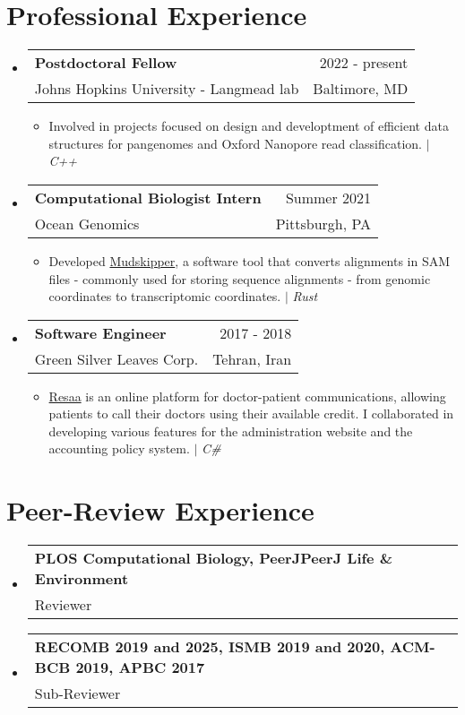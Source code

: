 \documentclass[A4,11pt]{article}
\makeatletter
\newcommand{\CVItem}[1]{
  \item\small{
    {#1 \vspace{-2pt}}
  }
}
\newcommand{\CVSubheading}[4]{
  \vspace{-2pt}\item
    \begin{tabular*}{0.97\textwidth}[t]{l@{\extracolsep{\fill}}r}
      \textbf{#1} & #2 \\
      \small#3 & \small #4 \\
    \end{tabular*}\vspace{-7pt}
}
\newcommand{\CVSubHeadingListStart}{\begin{itemize}[leftmargin=0.5cm, label={}]}
\newcommand{\CVSubHeadingListEnd}{\end{itemize}}
\newcommand{\CVItemListStart}{\begin{itemize}}
\newcommand{\CVItemListEnd}{\end{itemize}\vspace{-5pt}}
\makeatother
\begin{document}
\section{Professional Experience}
  \CVSubHeadingListStart
    \CVSubheading{Postdoctoral Fellow}{2022 - present}
      {Johns Hopkins University - Langmead lab}{Baltimore, MD}
      \CVItemListStart
        \CVItem{Involved in projects focused on design and developtment of efficient data structures for pangenomes and Oxford Nanopore read classification. $|$ \emph{\small{C++}}}
      \CVItemListEnd
    \CVSubheading
      {Computational Biologist Intern}{Summer 2021} %
      {Ocean Genomics}{Pittsburgh, PA}
      \CVItemListStart
        \CVItem{Developed \href{https://github.com/OceanGenomics/mudskipper}{Mudskipper}, a software tool that converts alignments in SAM files - commonly used for storing
sequence alignments - from genomic coordinates to transcriptomic coordinates. $|$ \emph{\small{Rust}}}
      \CVItemListEnd
    \CVSubheading
      {Software Engineer}{2017 - 2018} %
      {Green Silver Leaves Corp.}{Tehran, Iran}
      \CVItemListStart
        \CVItem{\href{https://resaa.net/}{Resaa} is an online platform for doctor-patient communications, allowing patients to call
        their doctors using their available credit. I collaborated in developing various features for the administration website and the accounting
        policy system. $|$ \emph{\small{C\#}}}
      \CVItemListEnd
  \CVSubHeadingListEnd
  
\section{Peer-Review Experience}
\CVSubHeadingListStart
\CVSubheading {PLOS Computational Biology, PeerJPeerJ Life \& Environment}{}{Reviewer}{}
\CVSubheading {RECOMB 2019 and 2025, ISMB 2019 and 2020, ACM-BCB 2019, APBC 2017}{}{Sub-Reviewer}{}
\CVSubHeadingListEnd
\end{document}
